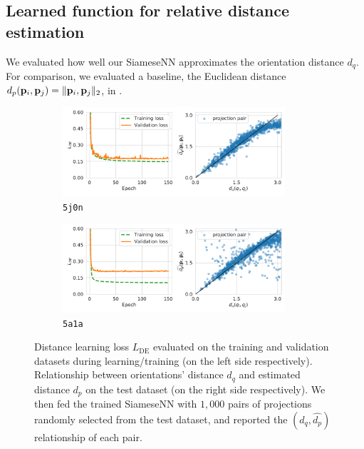 
\subsection{Learned function for relative distance estimation }\label{sec:results:distance-estimation:learned}


We evaluated how well our SiameseNN approximates the orientation distance $d_q$.
For comparison, we evaluated a baseline, the Euclidean distance $d_p(\mathbf{p}_i,\mathbf{p}_j) = \|\mathbf{p}_i, \mathbf{p}_j\|_2$, in .

\begin{figure}[ht!]
    \centering
    \begin{subfigure}[t]{0.45\linewidth}
        \includegraphics[height=3.3cm]{figures/de_loss_dPdQ_5j0n.pdf}
        \caption{\texttt{5j0n}}%
        \label{fig:losses-siamese-assym}
    \end{subfigure} \quad \quad
    \begin{subfigure}[t]{0.5\linewidth}
        \includegraphics[height=3.3cm]{figures/de_loss_dPdQ_5a1a.pdf}
        \caption{\texttt{5a1a}}%
        \label{fig:losses-siamese-sym}
    \end{subfigure}
    \caption{%
        Distance learning loss $L_\text{DE}$  evaluated on the training and validation datasets during learning/training (on the left side respectively).
        Relationship between orientations' distance $d_q$ and estimated distance $d_p$ on the test dataset (on the right side respectively).
        We then fed the trained SiameseNN with $1,000$ pairs of projections randomly selected from the test dataset, and reported the $(d_q,\widehat{d_p})$ relationship of each pair.
    }\label{fig:losses-siamese}
\end{figure}

